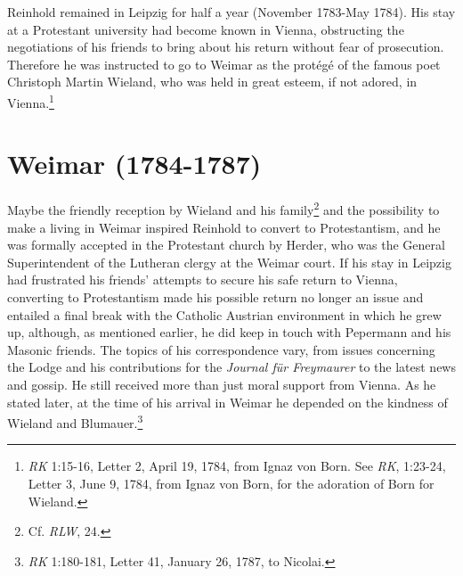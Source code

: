 Reinhold remained in Leipzig for half a year (November 1783{-}May 1784). His stay at a Protestant university had become known in Vienna, obstructing the negotiations of his friends to bring about his return without fear of prosecution. Therefore he was instructed to go to Weimar as the prot\'{e}g\'{e} of the famous poet Christoph Martin Wieland, who was held in great esteem, if not adored, in Vienna.\footnote{ \textit{RK} 1:15{-}16, Letter 2, April 19, 1784, from Ignaz von Born. See \textit{RK}, 1:23{-}24, Letter 3, June 9, 1784, from Ignaz von Born, for the adoration of Born for Wieland. } 


\section{Weimar (1784{-}1787)}


Maybe the friendly reception by Wieland and his family\footnote{ Cf. \textit{RLW}, 24. } and the possibility to make a living in Weimar inspired Reinhold to convert to Protestantism, and he was formally accepted in the Protestant church by Herder, who was the General Superintendent of the Lutheran clergy at the Weimar court. If his stay in Leipzig had frustrated his friends' attempts to secure his safe return to Vienna, converting to Protestantism made his possible return no longer an issue and entailed a final break with the Catholic Austrian environment in which he grew up, although, as mentioned earlier, he did keep in touch with Pepermann and his Masonic friends. The topics of his correspondence vary, from issues concerning the Lodge and his contributions for the \textit{Journal f\"{u}r Freymaurer }to the latest news and gossip. He still received more than just moral support from Vienna. As he stated later, at the time of his arrival in Weimar he depended on the kindness of Wieland and Blumauer.\footnote{ \textit{RK} 1:180{-}181, Letter 41, January 26, 1787, to Nicolai.}

